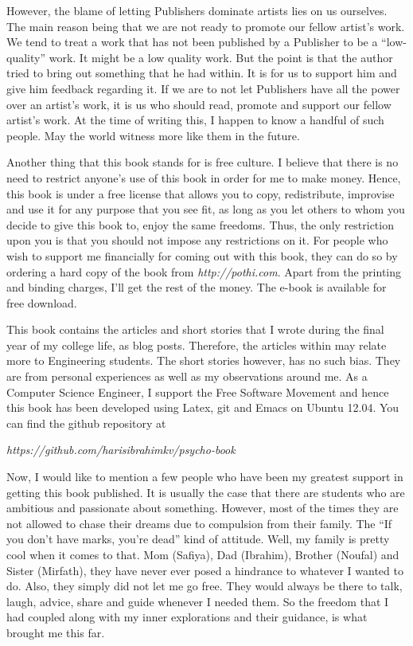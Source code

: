 \documentclass[twoside,11pt,titlepage]{article}
\begin{document}
However, the blame of letting Publishers dominate artists lies on us ourselves. The main reason being that we are not ready to promote our fellow artist's work. We tend to treat a work that has not been published by a Publisher to be a ``low-quality'' work. It might be a low quality work. But the point is that the author tried to bring out something that he had within. It is for us to support him and give him feedback regarding it. If we are to not let Publishers have all the power over an artist's work, it is us who should read, promote and support our fellow artist's work. At the time of writing this, I happen to know a handful of such people. May the world witness more like them in the future.

Another thing that this book stands for is free culture. I believe that there is no need to restrict anyone's use of this book in order for me to make money. Hence, this book is under a free license that allows you to copy, redistribute, improvise and use it for any purpose that you see fit, as long as you let others to whom you decide to give this book to, enjoy the same freedoms. Thus, the only restriction upon you is that you should not impose any restrictions on it. For people who wish to support me financially for coming out with this book, they can do so by ordering a hard copy of the book from \emph{http://pothi.com}. Apart from the printing and binding charges, I'll get the rest of the money. The e-book is available for free download.

This book contains the articles and short stories that I wrote during the final year of my college life, as blog posts. Therefore, the articles within may relate more to Engineering students. The short stories however, has no such bias. They are from personal experiences as well as my observations around me. As a Computer Science Engineer, I support the Free Software Movement and hence this book has been developed using Latex, git and Emacs on Ubuntu 12.04. You can find the github repository at
 
\emph{https://github.com/harisibrahimkv/psycho-book}

Now, I would like to mention a few people who have been my greatest support in getting this book published. It is usually the case that there are students who are ambitious and passionate about something. However, most of the times they are not allowed to chase their dreams due to compulsion from their family. The ``If you don't have marks, you're dead'' kind of attitude. Well, my family is pretty cool when it comes to that. Mom (Safiya), Dad (Ibrahim), Brother (Noufal) and Sister (Mirfath), they have never ever posed a hindrance to whatever I wanted to do. Also, they simply did not let me go free. They would always be there to talk, laugh, advice, share and guide whenever I needed them. So the freedom that I had coupled along with my inner explorations and their guidance, is what brought me this far.
\end{document}
